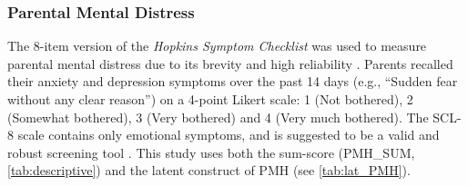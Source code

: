 \subsubsection{Parental Mental Distress}

The 8-item version of the \textit{Hopkins Symptom Checklist} \parencite[originally SCL-90,][]{derogatis:1974} was used to measure parental mental distress \parencite[Norwegian translation of SCL-8,][]{fink:2004a} due to its brevity and high reliability \parencite{siqveland:2016}. Parents recalled their anxiety and depression symptoms over the past 14 days (e.g., ``Sudden fear without any clear reason'') on a 4-point Likert scale: 1 (Not bothered), 2 (Somewhat bothered), 3 (Very bothered) and 4 (Very much bothered). The SCL-8 scale contains only emotional symptoms, and is suggested to be a valid and robust screening tool \parencite[$\alpha = .91$,][]{fink:2004a, fink:2004b}. This study uses both the sum-score (PMH\_SUM, \cref{tab:descriptive}) and the latent construct of PMH (see \cref{tab:lat_PMH}).




